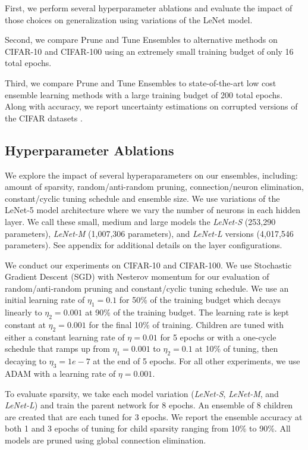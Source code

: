 \documentclass[letterpaper]{article} %
\begin{document}
First, we perform several hyperparameter ablations and evaluate the impact of those choices on generalization using variations of the LeNet model.

Second, we compare Prune and Tune Ensembles to alternative methods on CIFAR-10 and CIFAR-100 using an extremely small training budget of only 16 total epochs.

Third, we compare Prune and Tune Ensembles to state-of-the-art low cost ensemble learning methods with a large training budget of 200 total epochs. Along with accuracy, we report uncertainty estimations on corrupted versions of the CIFAR datasets \cite{nado2021uncertainty, hendrycks2019robustness}.

\subsection{Hyperparameter Ablations}

We explore the impact of several hyperaparameters on our ensembles, including: amount of sparsity, random/anti-random pruning, connection/neuron elimination, constant/cyclic tuning schedule and ensemble size. We use variations of the LeNet-5 model architecture where we vary the number of neurons in each hidden layer. We call these small, medium and large models the {\it LeNet-S} (253,290 parameters), {\it LeNet-M} (1,007,306 parameters), and {\it LeNet-L} versions (4,017,546 parameters). See appendix for additional details on the layer configurations.

We conduct our experiments on CIFAR-10 and CIFAR-100. We use Stochastic Gradient Descent (SGD) with Nesterov momentum for our evaluation of random/anti-random pruning and constant/cyclic tuning schedule. We use an initial learning rate of $\eta_1 = 0.1$ for 50\% of the training budget which decays linearly to $\eta_2 = 0.001$ at 90\% of the training budget. The learning rate is kept constant at $\eta_2 = 0.001$ for the final 10\% of training. Children are tuned with either a constant learning rate of $\eta=0.01$ for 5 epochs or with a one-cycle schedule that ramps up from $\eta_1=0.001$ to $\eta_2=0.1$ at 10\% of tuning, then decaying to $\eta_3=1e-7$ at the end of 5 epochs. For all other experiments, we use ADAM with a learning rate of $\eta = 0.001$.

To evaluate sparsity, we take each model variation ({\it LeNet-S}, {\it LeNet-M}, and {\it LeNet-L}) and train the parent network for 8 epochs. An ensemble of 8 children are created that are each tuned for 3 epochs. We report the ensemble accuracy at both 1 and 3 epochs of tuning for child sparsity ranging from 10\% to 90\%.
All models are pruned using global connection elimination.
\end{document}
